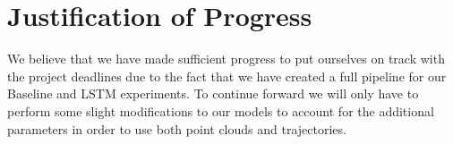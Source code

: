 \documentclass[letterpaper, 12 pt, conference]{ieeeconf}
\begin{document}
\section{Justification of Progress}

We believe that we have made sufficient progress to put ourselves on track with the project deadlines due to the fact that we have created a full pipeline for our Baseline and LSTM experiments. To continue forward we will only have to perform some slight modifications to our models to account for the additional parameters in order to use both point clouds and trajectories.


%


\end{document}
